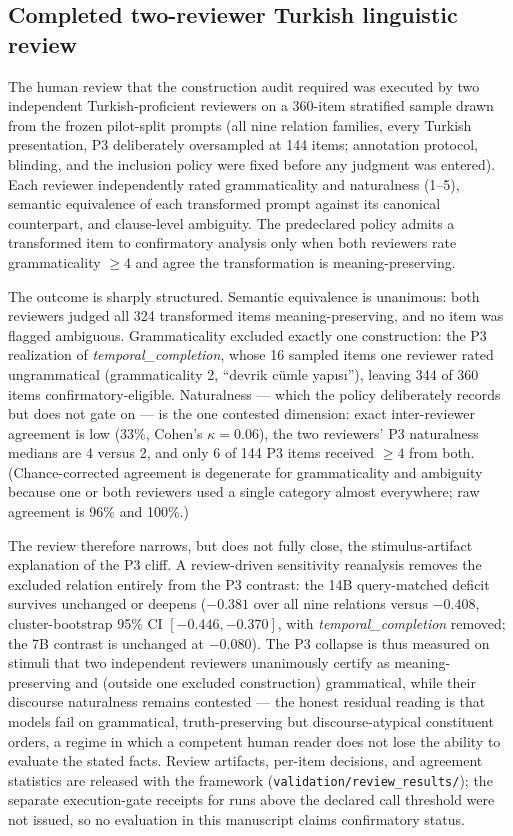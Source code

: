 \subsection{Completed two-reviewer Turkish linguistic review}
\label{sec:review}

The human review that the construction audit required was executed by two independent Turkish-proficient
reviewers on a 360-item stratified sample drawn from the frozen pilot-split prompts (all nine relation
families, every Turkish presentation, P3 deliberately oversampled at 144 items; annotation protocol,
blinding, and the inclusion policy were fixed before any judgment was entered). Each reviewer
independently rated grammaticality and naturalness (1--5), semantic equivalence of each transformed
prompt against its canonical counterpart, and clause-level ambiguity. The predeclared policy admits a
transformed item to confirmatory analysis only when both reviewers rate grammaticality $\ge 4$ and agree
the transformation is meaning-preserving.

The outcome is sharply structured. Semantic equivalence is unanimous: both reviewers judged all 324
transformed items meaning-preserving, and no item was flagged ambiguous. Grammaticality excluded exactly
one construction: the P3 realization of \emph{temporal\_completion}, whose 16 sampled items one reviewer
rated ungrammatical (grammaticality 2, ``devrik c\"umle yap\i{}s\i{}''), leaving 344 of 360 items
confirmatory-eligible. Naturalness --- which the policy deliberately records but does not gate on --- is
the one contested dimension: exact inter-reviewer agreement is low (33\%, Cohen's $\kappa = 0.06$), the
two reviewers' P3 naturalness medians are 4 versus 2, and only 6 of 144 P3 items received $\ge 4$ from
both. (Chance-corrected agreement is degenerate for grammaticality and ambiguity because one or both
reviewers used a single category almost everywhere; raw agreement is 96\% and 100\%.)

The review therefore narrows, but does not fully close, the stimulus-artifact explanation of the P3
cliff. A review-driven sensitivity reanalysis removes the excluded relation entirely from the P3
contrast: the 14B query-matched deficit survives unchanged or deepens ($-0.381$ over all nine relations
versus $-0.408$, cluster-bootstrap 95\% CI $[-0.446, -0.370]$, with \emph{temporal\_completion} removed;
the 7B contrast is unchanged at $-0.080$). The P3 collapse is thus measured on stimuli that two
independent reviewers unanimously certify as meaning-preserving and (outside one excluded construction)
grammatical, while their discourse naturalness remains contested --- the honest residual reading is that
models fail on grammatical, truth-preserving but discourse-atypical constituent orders, a regime in which
a competent human reader does not lose the ability to evaluate the stated facts. Review artifacts,
per-item decisions, and agreement statistics are released with the framework
(\texttt{validation/review\_results/}); the separate execution-gate receipts for runs above the declared
call threshold were not issued, so no evaluation in this manuscript claims confirmatory status.

